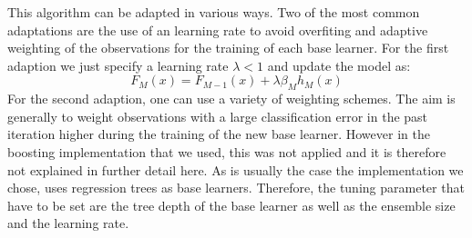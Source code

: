 This algorithm can be adapted in various ways. Two of the most common adaptations are the use of an learning rate to avoid overfiting and adaptive weighting of the observations for the training of each base learner. For the first adaption we just specify a learning rate $\lambda < 1$ and update the model as: 
$$F_M(x) = F_{M-1}(x) + \lambda \beta_M h_M(x)$$
For the second adaption, one can use a variety of weighting schemes. The aim is generally to weight observations with a large classification error in the past iteration higher during the training of the new base learner. However in the boosting implementation that we used, this was not applied and it is therefore not explained in further detail here.
As is usually the case the implementation we chose, uses regression trees as base learners. Therefore, the tuning parameter that have to be set are the tree depth of the base learner as well as the ensemble size and the learning rate.